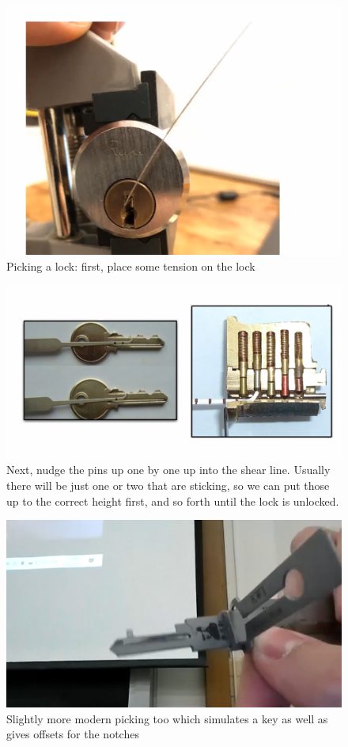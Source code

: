 \documentclass[../notes.tex]{subfiles}
\begin{document}
\begin{figure}[H]
    \centering
    \includegraphics[width=0.8\linewidth]{img/image_2023-04-16-20-59-09.png}
    \caption{Picking a lock: first, place some tension on the lock}
\end{figure}

\begin{figure}[H]
    \centering
    \includegraphics[width=0.8\linewidth]{img/image_2023-04-16-20-58-51.png}
    \caption{Next, nudge the pins up one by one up into the shear line. Usually there will be just one or two that are sticking, so we can put those up to the correct height first, and so forth until the lock is unlocked.}
\end{figure}

\begin{figure}[H]
    \centering
    \includegraphics[width=0.8\linewidth]{img/image_2023-04-16-21-00-50.png}
    \caption{Slightly more modern picking too which simulates a key as well as gives offsets for the notches}
\end{figure}
\end{document}
